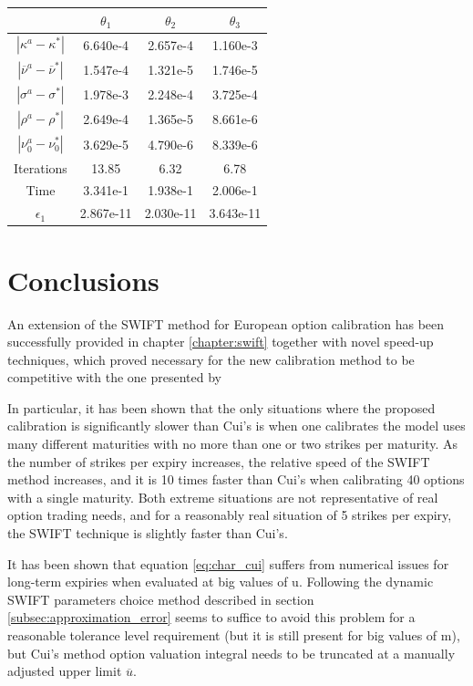\documentclass[12,twoside]{mammeTFM}
\theoremstyle{definition}
\theoremstyle{remark}
\begin{document}
\begin{center}
 \begin{tabular}{|c | c | c | c|} 
 \hline
  & $\theta_1$ & $\theta_2$ & $\theta_3$\\ [0.5ex] 
 \hline
 $|\kappa^{a} - \kappa^{*}|$ & 6.640e-4 & 2.657e-4 & 1.160e-3 \\ 
 \hline
 $|\overline{\nu}^{a} - \overline{\nu}^{*}|$ & 1.547e-4 & 1.321e-5 & 1.746e-5\\
 \hline
 $|\sigma^{a} - \sigma^{*}|$ & 1.978e-3 & 2.248e-4 & 3.725e-4 \\
 \hline
 $|\rho^{a} - \rho^{*}|$ & 2.649e-4 & 1.365e-5 & 8.661e-6  \\
 \hline
 $|\nu_0^{a} - \nu_0^{*}|$ & 3.629e-5 & 4.790e-6 & 8.339e-6  \\
 \hline
 Iterations & 13.85 & 6.32 & 6.78 \\
 \hline
 Time & 3.341e-1 & 1.938e-1 & 2.006e-1 \\
 \hline
 $\epsilon_1$ & 2.867e-11 & 2.030e-11 & 3.643e-11\\
 \hline
\end{tabular}
\end{center}

\section{Conclusions}

An extension of the SWIFT method for European option calibration has been successfully provided in chapter \ref{chapter:swift} together with novel speed-up techniques, which proved necessary for the new calibration method to be competitive with the one presented by \cite{cui17}

In particular, it has been shown that the only situations where the proposed calibration is significantly slower than Cui's is when one calibrates the model uses many different maturities with no more than one or two strikes per maturity. As the number of strikes per expiry increases, the relative speed of the SWIFT method increases, and it is 10 times faster than Cui's when calibrating 40 options with a single maturity. Both extreme situations are not representative of real option trading needs, and for a reasonably real situation of 5 strikes per expiry, the SWIFT technique is slightly faster than Cui's.

It has been shown that equation \ref{eq:char_cui} suffers from numerical issues for long-term expiries when evaluated at big values of u. Following the dynamic SWIFT parameters choice method described in section \ref{subsec:approximation_error} seems to suffice to avoid this problem for a reasonable tolerance level requirement (but it is still present for big values of m), but Cui's method option valuation integral needs to be truncated at a manually adjusted upper limit $\overline{u}$.
\end{document}
